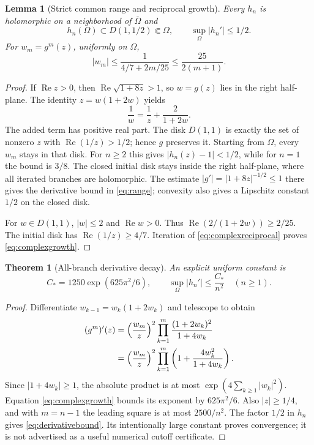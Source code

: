 \documentclass[10pt]{article}
\newcommand{\Rea}{\operatorname{Re}}
\newtheorem{theorem}{Theorem}
\newtheorem{lemma}{Lemma}
\begin{document}
\begin{lemma}[Strict common range and reciprocal growth]
Every $h_n$ is holomorphic on a neighborhood of $\overline\Omega$ and
\begin{equation}
h_n(\Omega)\subset D(1,1/2)\Subset\Omega,\qquad
\sup_\Omega|h_n'|\le1/2.
\label{eq:range}
\end{equation}
For $w_m=g^m(z)$, uniformly on $\Omega$,
\begin{equation}
|w_m|\le\frac1{4/7+2m/25}\le\frac{25}{2(m+1)}.
\label{eq:complexgrowth}
\end{equation}
\end{lemma}
\begin{proof}
If $\Rea z>0$, then $\Rea\sqrt{1+8z}>1$, so $w=g(z)$ lies in the right
half-plane. The identity $z=w(1+2w)$ yields
\begin{equation}
\frac1w=\frac1z+\frac2{1+2w}.
\label{eq:complexreciprocal}
\end{equation}
The added term has positive real part. The disk $D(1,1)$ is exactly the set
of nonzero $z$ with $\Rea(1/z)>1/2$; hence $g$ preserves it.
Starting from $\Omega$, every $w_m$ stays in that disk. For $n\ge2$ this
gives $|h_n(z)-1|<1/2$, while for $n=1$ the bound is $3/8$.
The closed initial disk stays inside the right half-plane, where all iterated
branches are holomorphic. The estimate $|g'|=|1+8z|^{-1/2}\le1$ there gives
the derivative bound in \eqref{eq:range}; convexity also gives a Lipschitz
constant $1/2$ on the closed disk.

For $w\in D(1,1)$, $|w|\le2$ and $\Rea w>0$. Thus
$\Rea(2/(1+2w))\ge2/25$. The initial disk has
$\Rea(1/z)\ge4/7$. Iteration of \eqref{eq:complexreciprocal} proves
\eqref{eq:complexgrowth}.
\end{proof}

\begin{theorem}[All-branch derivative decay]
An explicit uniform constant is
\begin{equation}
C_*=1250\exp(625\pi^2/6),\qquad
\sup_\Omega|h_n'|\le\frac{C_*}{n^2}\quad(n\ge1).
\label{eq:derivativebound}
\end{equation}
\end{theorem}
\begin{proof}
Differentiate $w_{k-1}=w_k(1+2w_k)$ and telescope to obtain
\begin{align}
(g^m)'(z)
&=\left(\frac{w_m}{z}\right)^2
\prod_{k=1}^m\frac{(1+2w_k)^2}{1+4w_k}\notag\\
&=\left(\frac{w_m}{z}\right)^2
\prod_{k=1}^m\left(1+\frac{4w_k^2}{1+4w_k}\right).
\label{eq:derivativeproduct}
\end{align}
Since $|1+4w_k|\ge1$, the absolute product is at most
$\exp(4\sum_{k\ge1}|w_k|^2)$. Equation \eqref{eq:complexgrowth} bounds
its exponent by $625\pi^2/6$. Also $|z|\ge1/4$, and with $m=n-1$ the
leading square is at most $2500/n^2$. The factor $1/2$ in $h_n$ gives
\eqref{eq:derivativebound}. Its intentionally large constant proves
convergence; it is not advertised as a useful numerical cutoff certificate.
\end{proof}
\end{document}
